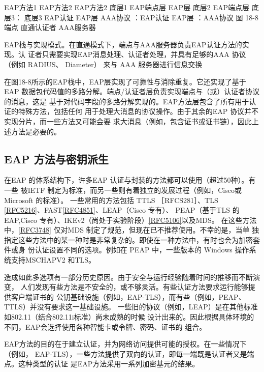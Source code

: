EAP方法1
EAP方法2
EAP方法2
底层1
EAP端点层
EAP层
底层2
EAP端点层
底层3：
底层3
EAP认证
EAP层
AAA协议
：EAP认证
EAP层
：AAA协议
图 18-8
端点
直通认证者
AAA服务器

EAP栈与实现模式。在直通模式下，端点与AAA服务器负责EAP认证方法的实现。认
证者只需要实现EAP消息处理、认证者处理，并具有足够的AAA 协议（例如 RADIUS、
Diameter） 来与 AAA 服务器进行信息交换

在图18-8所示的EAP栈中，EAP层实现了可靠性与消除重复。它还实现了基于EAP
数据包代码值的多路分解。端点/认证者层负责实现端点与（或）认证者协议的消息，这是
基于对代码字段的多路分解实现的。EAP方法层包含了所有用于认证的特殊方法，包括任何
用于处理大消息的协议操作。由于其余的EAP 协议并不实现分片，而一些方法又可能会要
求大消息（例如，包含证书或证书链），因此上述方法是必要的。

\subsection{EAP 方法与密钥派生}

在EAP 的体系结构下，许多EAP 认证与封装的方法都可以使用（超过50种）。有一些
被IETF 制定为标准，而另一些则有着独立的发展过程（例如，Cisco或 Microsoft 的标准）。
一些常用的方法包括 TTLS ［RFCS281］、TLS \href{https://www.rfc-editor.org/rfc/rfc5216}{[RFC5216]}、FAST\href{https://www.rfc-editor.org/rfc/rfc4851}{[RFC4851]}、LEAP（Cisco 专有）、
PEAP（基于TLS 的EAP,Cisco 专有）、IKEv2（尚处于实验阶段）\href{https://www.rfc-editor.org/rfc/rfc5106}{[RFC5106]}以及MDS。
在这些方法中，\href{https://www.rfc-editor.org/rfc/rfc3748}{[RFC3748]} 仅对MDS 制定了规范，但现在已不推荐使用。不幸的是，当单
独指定这些方法中的某一种时是非常复杂的。即使在一种方法中，有时也会为加密套件或身
份认证设置不同的选项。例如在 PEAP 中，一些版本的 Windows 操作系统支持MSCHAPV2
和TLS。

造成如此多选项有一部分历史原因。由于安全与运行经验随着时间的推移而不断演变，
人们发现有些方法是不安全的，或不够灵活。有些认证方法要求运行能够提供客户端证书的
公钥基础设施（例如，EAP-TLS），而有些（例如，PEAP、TTLS）并没有要求这一基础设施。
一些旧的协议（例如，LEAP）是在其他标准如802.11（结合802.11i标准）尚未成熟的时候
设计出来的。因此根据具体环境的不同，EAP会选择使用各种智能卡或令牌、密码、证书的
组合。

EAP方法的目的在于建立认证，并为网络访问提供可能的授权。在一些情况下（例如，
EAP-TLS），一些方法提供了双向的认证，即每一端既是认证者又是端点。这种类型的认证
是EAP方法采用一系列加密基元的结果。

